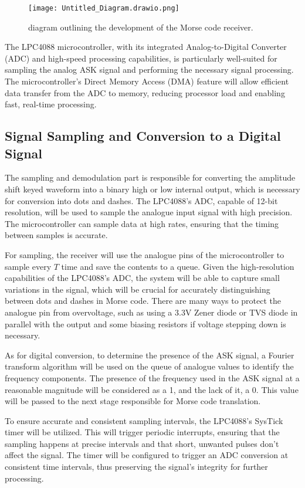 \documentclass{cce2014-design}
\begin{document}
\begin{figure}[h]
    \centering
    \texttt{[image: Untitled\_Diagram.drawio.png]}
    \caption{diagram outlining the development of the Morse code receiver.}
    \label{fig:stage_diagram}
\end{figure}

The LPC4088 microcontroller, with its integrated Analog-to-Digital Converter (ADC) and high-speed processing capabilities, is particularly well-suited for sampling the analog ASK signal and performing the necessary signal processing. The microcontroller's Direct Memory Access (DMA) feature will allow efficient data transfer from the ADC to memory, reducing processor load and enabling fast, real-time processing.

\subsection{Signal Sampling and Conversion to a Digital Signal}
The sampling and demodulation part is responsible for converting the amplitude shift keyed waveform into a binary high or low internal output, which is necessary for conversion into dots and dashes. The LPC4088’s ADC, capable of 12-bit resolution, will be used to sample the analogue input signal with high precision. The microcontroller can sample data at high rates, ensuring that the timing between samples is accurate.

For sampling, the receiver will use the analogue pins of the microcontroller to sample every \( T \) time and save the contents to a queue. Given the high-resolution capabilities of the LPC4088’s ADC, the system will be able to capture small variations in the signal, which will be crucial for accurately distinguishing between dots and dashes in Morse code. There are many ways to protect the analogue pin from overvoltage, such as using a 3.3V Zener diode or TVS diode in parallel with the output and some biasing resistors if voltage stepping down is necessary.

As for digital conversion, to determine the presence of the ASK signal, a Fourier transform algorithm will be used on the queue of analogue values to identify the frequency components. The presence of the frequency used in the ASK signal at a reasonable magnitude will be considered as a 1, and the lack of it, a 0. This value will be passed to the next stage responsible for Morse code translation.

To ensure accurate and consistent sampling intervals, the LPC4088’s SysTick timer will be utilized. This will trigger periodic interrupts, ensuring that the sampling happens at precise intervals and that short, unwanted pulses don’t affect the signal. The timer will be configured to trigger an ADC conversion at consistent time intervals, thus preserving the signal’s integrity for further processing.
\end{document}
